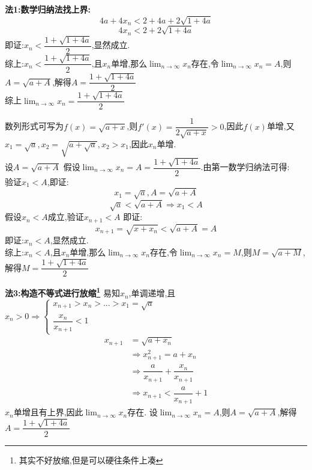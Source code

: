 \documentclass[8pt a4paper, oneside, UTF8]{ctexbook}
\begin{document}
\begin{sloppypar}
\begin{solution}{\textbf{法1:数学归纳法找上界:}}
$$        $$
        $$
            4a+4x_n<2+4a+2\sqrt{1+4a}
        $$
        $$
            4x_n<2+2\sqrt{1+4a}
        $$
        即证:$x_n <\dfrac{1+\sqrt{1+4a}}{2}$,显然成立.\\
        综上:$x_n < \dfrac{1+\sqrt{1+4a}}{2}$,且$x_n$单增,那么$\lim_{n\to \infty}x_n$存在,令$\lim_{n\to \infty}x_n=A$,则$A=\sqrt{a+A}$,解得$A=\dfrac{1+\sqrt{1+4a}}{2}$\\
        综上$\lim_{n\to \infty}x_n=\dfrac{1+\sqrt{1+4a}}{2}$
    \end{solution}
    \begin{solution}[dadada]
        数列形式可写为$f(x)=\sqrt{a+x}$,则$f'(x)=\dfrac{1}{2\sqrt{a+x}}>0$,因此$f(x)$单增,又$x_1=\sqrt{a},x_2=\sqrt{a+\sqrt{a}},x_2>x_1$,因此$x_n$单增.\\
        设$A=\sqrt{a+A}$ 假设$\lim_{n\to \infty}x_n=A=\dfrac{1+\sqrt{1+4a}}{2}$.由第一数学归纳法可得:\\
        验证$x_1<A$,即证:$$
            x_1=\sqrt{a},A=\sqrt{a+A}
        $$
        $$
            \sqrt{a}<\sqrt{a+A} \Rightarrow x_1 <A
        $$
        假设$x_n<A$成立,验证$x_{n+1} < A $
        即证:$$
            x_{n+1}=\sqrt{x+x_n}<\sqrt{a+A}=A
        $$
        即证:$x_n < A$,显然成立.\\
        综上:$x_n < A$,且$x_n$单增,那么$\lim_{n\to \infty}x_n$存在,令$\lim_{n\to \infty}x_n=M$,则$M=\sqrt{a+M}$,解得$M=\dfrac{1+\sqrt{1+4a}}{2}$
    \end{solution}
    \begin{solution}{\textbf{法3:构造不等式进行放缩\footnote{其实不好放缩,但是可以硬往条件上凑}}}
        易知$x_n$,单调递增,且$x_n>0 \Rightarrow \begin{cases}
                x_{n+1}>x_n>...>x_1=\sqrt{a} \\
                \dfrac{x_n}{x_{n+1}}<1
            \end{cases}$
        \begin{align*}
            x_{n+1} & = \sqrt{a+x_n}                                      \\
                    & \Rightarrow x^2_{n+1}=a+x_n                         \\
                    & \Rightarrow \dfrac{a}{x_{n+1}}+\dfrac{x_n}{x_{n+1}} \\
                    & \Rightarrow x_{n+1}<\dfrac{a}{x_{n+1}}+1
        \end{align*}
        $x_n$单增且有上界,因此$\lim_{n\to \infty}x_n$存在.
        设$\lim_{n\to \infty}x_n=A$,则$A=\sqrt{a+A}$,解得$A=\dfrac{1+\sqrt{1+4a}}{2}$\\

\end{solution}
\end{sloppypar}
\end{document}
